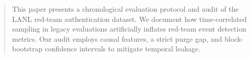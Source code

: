 \begin{abstract}
This paper presents a chronological evaluation protocol and audit of the LANL red-team authentication dataset. We document how time-correlated sampling in legacy evaluations artificially inflates red-team event detection metrics. Our audit employs causal features, a strict purge gap, and block-bootstrap confidence intervals to mitigate temporal leakage.
\end{abstract}

